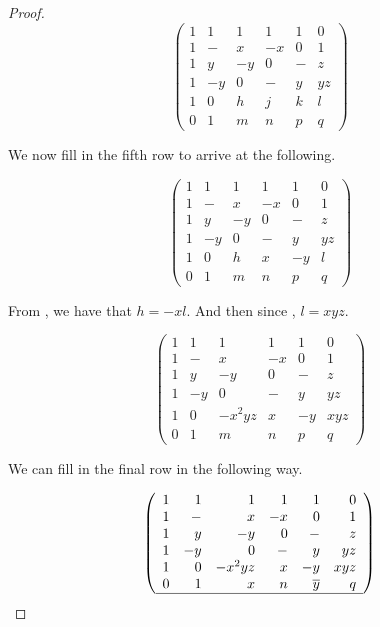 \begin{lemma}
\begin{proof}
\begin{equation} \label{mat:3b-1}
\left(\begin{array}{rrrrrr}
 1 &  1 & 1 & 1 & 1 & 0 \\
 1 &  - & x & -x & 0 & 1 \\ 
 1 &  y & -y & 0 & - & z \\
 1 &  -y & 0 & - & y & yz \\ \hline
 1 &  0 & h & j & k & l \\
 0 &  1 & m & n & p & q
\end{array}\right)
\end{equation}

We now fill in the fifth row to arrive at the following.

\begin{equation} \label{mat:3b-2}
\left(\begin{array}{rrrrrr}
               1 & 1 & 1 &  1 &  1 & 0 \\
               1 & - & x & -x &  0 & 1 \\
               1 & y & -y &  0 & - & z \\
               1 & -y & 0 & - & y & yz \\
               1 & 0 & h & x & -y & l \\ \hline
               0 &  1 & m & n & p & q
             \end{array}\right)
\end{equation}

From , we have that $h = -xl$. And then since , $l = xyz$.

\begin{equation} \label{mat:3b-3}
\left(\begin{array}{rrrrrr}
               1 & 1 & 1 &  1 &  1 & 0 \\
               1 & - & x & -x &  0 & 1 \\
               1 & y & -y &  0 & - & z \\
               1 & -y & 0 & - & y & yz \\
               1 & 0 & -x^2yz & x & -y & xyz \\ \hline
               0 &  1 & m & n & p & q
             \end{array}\right)
\end{equation}

We can fill in the final row in the following way.

\begin{equation} \label{mat:3b-4}
\left(\begin{array}{rrrrrr}
               1 & 1 & 1 &  1 &  1 & 0 \\
               1 & - & x & -x &  0 & 1 \\
               1 & y & -y &  0 & - & z \\
               1 & -y & 0 & - & y & yz \\
               1 & 0 & -x^2yz & x & -y & xyz \\
               0 &  1 & x & n & \overline{y} & q \\ \hline
             \end{array}\right)
\end{equation}


\end{proof}
\end{lemma}
